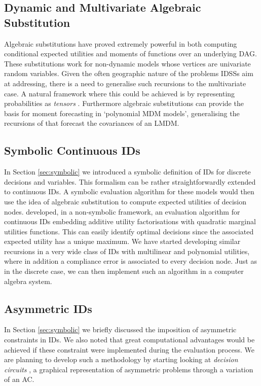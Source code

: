 \subsection*{Dynamic and Multivariate Algebraic Substitution}
Algebraic substitutions have proved extremely powerful in both computing conditional expected utilities and moments of functions over an underlying DAG. These substitutions work for non-dynamic  models whose vertices are  univariate random variables. Given the often geographic nature of the problems IDSSs aim at addressing, there is a need to generalise such recursions to the multivariate case. A natural framework where this could be achieved is by representing probabilities as \textit{tensors} \citep[see e.g.][for a discussion of their use in statistics]{McCullagh1987}. Furthermore algebraic substitutions can provide the basis for moment forecasting in \lq{p}olynomial MDM models\rq , generalising the recursions of \citet{Queen2008} that forecast the covariances of an LMDM.

\subsection*{Symbolic Continuous IDs}
In Section \ref{sec:symbolic} we introduced a symbolic definition of IDs for discrete decisions and variables. This formalism can be rather straightforwardly extended to continuous IDs. A symbolic evaluation algorithm for these models would then use the idea of algebraic substitution to compute expected utilities of decision nodes. \citet{Madsen2005} developed, in a non-symbolic framework, an evaluation algorithm for continuous IDs embedding additive utility factorisations with quadratic marginal utilities functions. This can easily identify optimal decisions since the associated expected utility has a unique maximum. We have started developing similar recursions in a very wide class of IDs with multilinear and polynomial utilities, where in addition a compliance error is associated to every decision node.  Just as in the discrete case, we can then implement such an algorithm in a computer algebra system.
   
\subsection*{Asymmetric IDs}
In Section \ref{sec:symbolic} we briefly discussed the imposition of asymmetric constraints in IDs. We also noted that great computational advantages would be achieved if these constraint were implemented during the evaluation process. We are planning to develop such a methodology by starting looking at \textit{decision circuits} \citep{Bhattacharjya2007,Bhattacharjya2012}, a graphical representation of asymmetric problems through a variation of an AC.  

